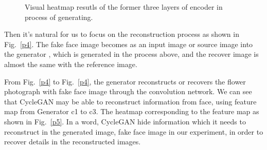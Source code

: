 \documentclass[a4paper]{article}
\begin{document}
	\begin{figure}
		\centering 
		\caption{Visual heatmap resutls of the former three layers of encoder in process of generating.}
		\label{p3}
	\end{figure}
	
	Then it's natural for us to focus on the reconstruction process as shown in Fig.~\ref{p4}. The fake face image becomes as an input image or source image into the generator , which is generated in the process above, and the recover image is almost the same with the reference image.
	
	From Fig.~\ref{p4} to Fig.~\ref{p4}, the generator reconstructs or recovers the flower photograph with fake face image through the convolution network. We can see that CycleGAN may be able to reconstruct information from face, using feature map from Generator c1 to c3. The heatmap corresponding to the feature map as shown in Fig.~\ref{p5}. In a word, CycleGAN hide information which it needs to reconstruct in the generated image, fake face image in our experiment, in order to recover details in the reconstructed images.
	
\end{document}
